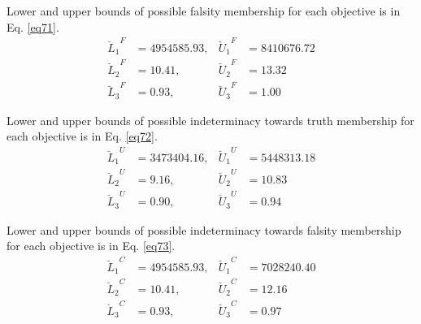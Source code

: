\documentclass[a4paper]{elsarticle}
\begin{document}
{\noindent Lower and upper bounds of possible falsity membership for each objective is in Eq. \ref{eq71}.
\begin{equation}
\label{eq71}
\begin{aligned}
{\breve{L}_1}^{F} &= 4954585.93, & {\breve{U}_1}^{F} &= 8410676.72 \\
{\breve{L}_2}^{F} &= 10.41,      & {\breve{U}_2}^{F} &= 13.32 \\
{\breve{L}_3}^{F} &= 0.93,       & {\breve{U}_3}^{F} &= 1.00
\end{aligned}
\end{equation}

\noindent Lower and upper bounds of possible indeterminacy towards truth membership for each objective is in Eq. \ref{eq72}.
\begin{equation}
\label{eq72}
\begin{aligned}
{\breve{L}_1}^{U} &= 3473404.16, & {\breve{U}_1}^{U} &= 5448313.18 \\
{\breve{L}_2}^{U} &= 9.16,       & {\breve{U}_2}^{U} &= 10.83 \\
{\breve{L}_3}^{U} &= 0.90,       & {\breve{U}_3}^{U} &= 0.94
\end{aligned}
\end{equation}

\noindent Lower and upper bounds of possible indeterminacy towards falsity membership for each objective is in Eq. \ref{eq73}.
\begin{equation}
\label{eq73}
\begin{aligned}
{\breve{L}_1}^{C} &= 4954585.93, & {\breve{U}_1}^{C} &= 7028240.40 \\
{\breve{L}_2}^{C} &= 10.41,      & {\breve{U}_2}^{C} &= 12.16 \\
{\breve{L}_3}^{C} &= 0.93,       & {\breve{U}_3}^{C} &= 0.97
\end{aligned}
\end{equation}

}
\end{document}
